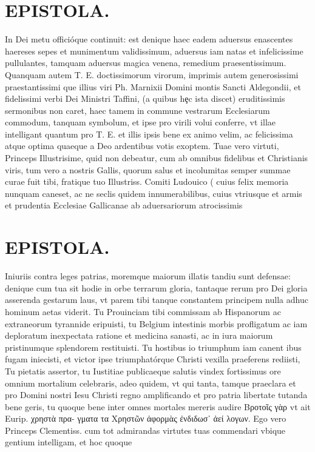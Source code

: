 \documentclass{article}
\begin{document}
\begin{pages}
\section*{EPISTOLA. }\pstart In Dei metu officióque continuit: est denique haec eadem aduersus enascentes haereses sepes et munimentum validissimum, aduersus iam natas et infelicissime pullulantes, tamquam aduersus magica venena, remedium praesentissimum. Quanquam autem T. E. doctissimorum virorum, imprimis autem generosissimi praestantissimi que illius viri Ph. Marnixii Domini montis Sancti Aldegondii, et fidelissimi verbi Dei Ministri Taffini, (a quibus hȩc ista discet) eruditissimis sermonibus non caret, haec tamem in commune vestrarum Ecclesiarum commodum, tanquam symbolum, et ipse pro virili volui conferre, vt illae intelligant quantum pro T. E. et illis ipsis bene ex animo velim, ac felicissima atque optima quaeque a Deo ardentibus votis exoptem. Tuae vero virtuti, Princeps Illustrisime, quid non debeatur, cum ab omnibus fidelibus et Christianis viris, tum vero a nostris Gallis, quorum salus et incolumitas semper summae curae fuit tibi, fratique tuo Illustriss. Comiti Ludouico ( cuius felix memoria nunquam caneset, ac ne seclis quidem innumerabilibus, cuius vtriusque et armis et prudentia Ecclesiae Gallicanae ab aduersariorum atrocissimis  \pend
\section*{EPISTOLA. }\pstart Iniuriis contra leges patrias, moremque maiorum illatis tandiu sunt defensae: denique cum tua sit hodie in orbe terrarum gloria, tantaque rerum pro Dei gloria asserenda gestarum laus, vt parem tibi tanque constantem principem nulla adhuc hominum aetas viderit. Tu Prouinciam tibi commissam ab Hispanorum ac extraneorum tyrannide eripuisti, tu Belgium intestinis morbis profligatum ac iam deploratum inexpectata ratione et medicina sanasti, ac in iura maiorum pristinumque splendorem restituisti. Tu hostibus io triumphum iam canent ibus fugam iniecisti, et victor ipse triumphatórque Christi vexilla praeferens rediisti, Tu pietatis assertor, tu Iustitiae publicaeque salutis vindex fortissimus ore omnium mortalium celebraris, adeo quidem, vt qui tanta, tamque praeclara et pro Domini nostri Iesu Christi regno amplificando et pro patria libertate tutanda bene geris, tu quoque bene inter omnes mortales mereris audire Βροτοῖς γὰρ vt ait Eurip. χρηστὰ πρα- γματα τα Χρηστῶν ἀφορμὰς ἐνδιδωσ᾽ ἀεί λογων. Ego vero Princeps Clementiss. cum tot admirandas virtutes tuas commendari vbique gentium intelligam, et hoc quoque  \pend

\end{pages}
\end{document}

